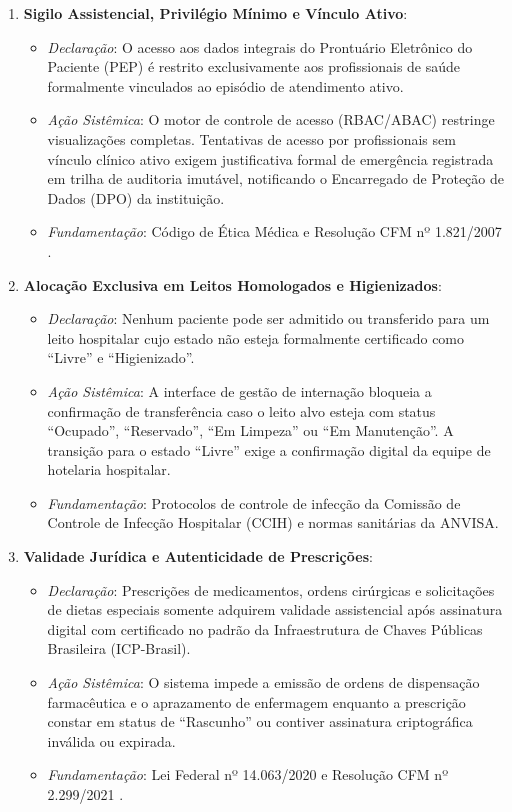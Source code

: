 \begin{enumerate}[label=\textbf{RN-\arabic*:}, leftmargin=*]
    \item \textbf{Sigilo Assistencial, Privilégio Mínimo e Vínculo Ativo}:
    \begin{itemize}[noitemsep]
        \item \textit{Declaração}: O acesso aos dados integrais do Prontuário Eletrônico do Paciente (PEP) é restrito exclusivamente aos profissionais de saúde formalmente vinculados ao episódio de atendimento ativo.
        \item \textit{Ação Sistêmica}: O motor de controle de acesso (RBAC/ABAC) restringe visualizações completas. Tentativas de acesso por profissionais sem vínculo clínico ativo exigem justificativa formal de emergência registrada em trilha de auditoria imutável, notificando o Encarregado de Proteção de Dados (DPO) da instituição.
        \item \textit{Fundamentação}: Código de Ética Médica e Resolução CFM nº 1.821/2007 \cite{cfm_prontuario:2007}.
    \end{itemize}

    \item \textbf{Alocação Exclusiva em Leitos Homologados e Higienizados}:
    \begin{itemize}[noitemsep]
        \item \textit{Declaração}: Nenhum paciente pode ser admitido ou transferido para um leito hospitalar cujo estado não esteja formalmente certificado como ``Livre'' e ``Higienizado''.
        \item \textit{Ação Sistêmica}: A interface de gestão de internação bloqueia a confirmação de transferência caso o leito alvo esteja com status ``Ocupado'', ``Reservado'', ``Em Limpeza'' ou ``Em Manutenção''. A transição para o estado ``Livre'' exige a confirmação digital da equipe de hotelaria hospitalar.
        \item \textit{Fundamentação}: Protocolos de controle de infecção da Comissão de Controle de Infecção Hospitalar (CCIH) e normas sanitárias da ANVISA.
    \end{itemize}

    \item \textbf{Validade Jurídica e Autenticidade de Prescrições}:
    \begin{itemize}[noitemsep]
        \item \textit{Declaração}: Prescrições de medicamentos, ordens cirúrgicas e solicitações de dietas especiais somente adquirem validade assistencial após assinatura digital com certificado no padrão da Infraestrutura de Chaves Públicas Brasileira (ICP-Brasil).
        \item \textit{Ação Sistêmica}: O sistema impede a emissão de ordens de dispensação farmacêutica e o aprazamento de enfermagem enquanto a prescrição constar em status de ``Rascunho'' ou contiver assinatura criptográfica inválida ou expirada.
        \item \textit{Fundamentação}: Lei Federal nº 14.063/2020 e Resolução CFM nº 2.299/2021 \cite{cfm_digital:2021}.
    \end{itemize}


\end{enumerate}
